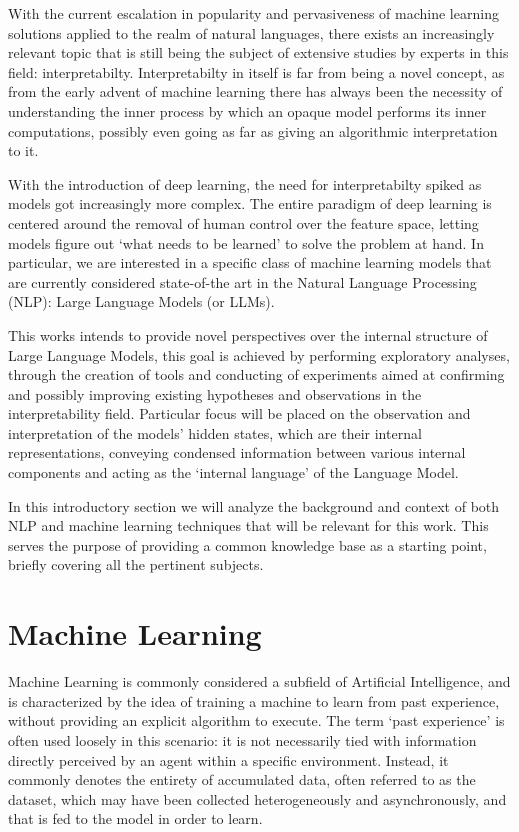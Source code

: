 
With the current escalation in popularity and pervasiveness of machine learning solutions applied to the realm of natural languages, there exists an increasingly relevant topic that is still being the subject of extensive studies by experts in this field: interpretabilty.
Interpretabilty in itself is far from being a novel concept, as from the early advent of machine learning there has always been the necessity of understanding the inner process by which an opaque model performs its inner computations, possibly even going as far as giving an algorithmic interpretation to it. 

With the introduction of deep learning, the need for interpretabilty spiked as models got increasingly more complex.
The entire paradigm of deep learning is centered around the removal of human control over the feature space, letting models figure out `what needs to be learned' to solve the problem at hand.
In particular, we are interested in a specific class of machine learning models that are currently considered state-of-the art in the Natural Language Processing (NLP): Large Language Models (or LLMs).

This works intends to provide novel perspectives over the internal structure of Large Language Models, this goal is achieved by performing exploratory analyses, through the creation of tools and conducting of experiments aimed at confirming and possibly improving existing hypotheses and observations in the interpretability field.
Particular focus will be placed on the observation and interpretation of the models' hidden states, which are their internal representations, conveying condensed information between various internal components and acting as the `internal language' of the Language Model.

In this introductory section we will analyze the background and context of both NLP and machine learning techniques that will be relevant for this work.
This serves the purpose of providing a common knowledge base as a starting point, briefly covering all the pertinent subjects.

\section{Machine Learning}

Machine Learning is commonly considered a subfield of Artificial Intelligence, and is characterized by the idea of training a machine to learn from past experience, without providing an explicit algorithm to execute.
The term `past experience' is often used loosely in this scenario: it is not necessarily tied with information directly perceived by an agent within a specific environment.
Instead, it commonly denotes the entirety of accumulated data, often referred to as the dataset, which may have been collected heterogeneously and asynchronously, and that is fed to the model in order to learn.

